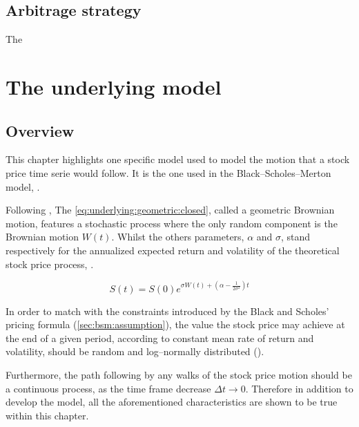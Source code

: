 \documentclass[12pt]{report}
\newcommand{\Bm}{W\left(t\right)}
\newcommand{\Dt}{\Delta t}
\newcommand{\St}{S\left(t\right)}
\newcommand{\Si}{S\left(0\right)}
\newcommand{\Scontinuous}{\St = \Si e^{\sigma\Bm + \left(\alpha - \frac{1}{2 \sigma^2}\right)t}}
\begin{document}
\section{Arbitrage strategy}
\label{sec:upstreamarbitrage}

The 
%
%
\chapter{The underlying model}
\label{cha:underlying}
  


\section{Overview}
\label{sec:underlying:overview}

This chapter highlights one specific model used to model the motion that a stock price time serie would follow. It is the one used in the Black--Scholes--Merton model, \citet{hull}.

Following \citet{shreve}, The \cref{eq:underlying:geometric:closed}, called a geometric Brownian motion, features a stochastic process where the only random component is the Brownian motion $\Bm$. Whilst the others parameters, $\alpha$ and $\sigma$, stand respectively for the annualized expected return and volatility of the theoretical stock price process, \citet{hull}.

\begin{center}
  \begin{equation}
    \Scontinuous
    \label{eq:underlying:geometric:closed}
  \end{equation}
\end{center}
 
In order to match with the constraints introduced by the Black and Scholes' pricing formula (\cref{sec:bsm:assumption}), the value the stock price may achieve at the end of a given period, according to constant mean rate of return and volatility, should be random and log--normally distributed (\citet{bs}).

Furthermore, the path following by any walks of the stock price motion should be  a continuous process, as the time frame decrease $\Dt \to 0$.
Therefore in addition to develop the model, all the aforementioned characteristics are shown to be true within this chapter.
\end{document}
